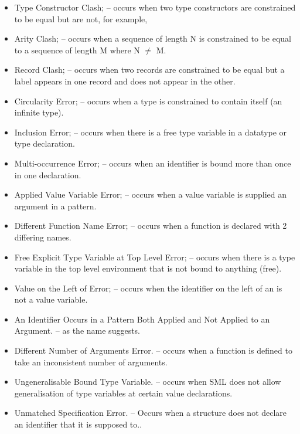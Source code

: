 \documentclass{report}
\begin{document}
\begin{itemize}

\item Type Constructor Clash; \subitem -- occurs
  when two type constructors are constrained to be equal but
  are not, for example, 
\item Arity Clash; \subitem -- occurs when a sequence of length N is
  constrained to be equal to a sequence of length M where N $\neq$ M.
\item Record Clash; \subitem -- occurs when two records are
  constrained to be equal but a label appears in one record and does
  not appear in the other.
\item Circularity Error; \subitem -- occurs when a type is
  constrained to contain itself (an infinite type).
\item Inclusion Error; \subitem -- occurs when there is a free type
  variable in a datatype or type declaration.
\item Multi-occurrence Error; \subitem -- occurs when an identifier
  is bound more than once in one declaration.
\item Applied Value Variable Error; \subitem -- occurs when a value
  variable is supplied an argument in a pattern.
\item Different Function Name Error; \subitem -- occurs when a
  function is declared with 2 differing names.
\item Free Explicit Type Variable at Top Level Error; \subitem --
  occurs when there is a type variable in the top level environment
  that is not bound to anything (free).
\item Value on the Left of  Error; \subitem --
  occurs when the identifier on the left of an  is
  not a value variable.
\item An Identifier Occurs in a Pattern Both Applied and Not Applied to
  an Argument. \subitem -- as the name suggests.
\item Different Number of Arguments Error.  \subitem -- occurs when a
  function is defined to take an inconsistent number of arguments.
\item Ungeneralisable Bound Type Variable.  \subitem -- occurs when SML does
  not allow generalisation of type variables at certain value
  declarations.
\item Unmatched Specification Error. \subitem -- Occurs when a structure does not declare an identifier that it is supposed to..
\end{itemize}
\end{document}
